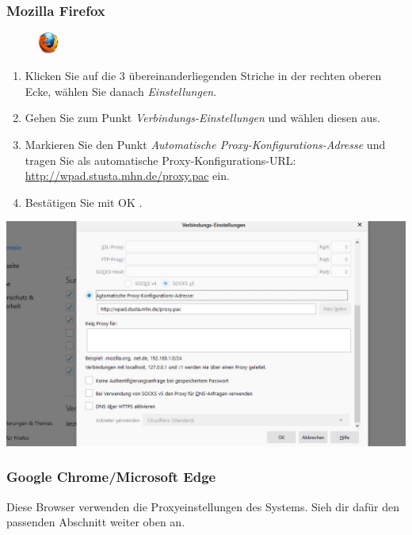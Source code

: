 \documentclass[a4paper,12pt]{scrartcl}
\begin{document}
\subsubsection*{Mozilla Firefox}

\begin{figure}[h]
	\raggedleft
	\vspace{-25pt}
	\includegraphics[height=0.7cm,keepaspectratio]{Bilder/Firefox_35_logo}
	\vspace{-20pt}
\end{figure}

\begin{minipage}{0.6\textwidth}
\begin{enumerate}
	\item Klicken Sie auf die 3 übereinanderliegenden Striche in der rechten oberen Ecke, wählen Sie danach \emph{Einstellungen}.
	\item Gehen Sie zum Punkt \emph{Verbindungs-Einstellungen} und wählen diesen aus.
	\item Markieren Sie den Punkt \emph{Automatische Proxy-Konfigurations-Adresse} und tragen Sie als automatische Proxy-Konfigurations-URL: \\ \url{http://wpad.stusta.mhn.de/proxy.pac} ein.
	\item Bestätigen Sie mit OK .
\end{enumerate}
\end{minipage}
\begin{minipage}{0.4\textwidth}
\centering
\includegraphics[width=\linewidth,keepaspectratio]{Bilder/Firefox_neu_proxy}
\end{minipage}


\subsubsection*{Google Chrome/Microsoft Edge}

Diese Browser verwenden die Proxyeinstellungen des Systems.
Sieh dir dafür den passenden Abschnitt weiter oben an.
\end{document}

